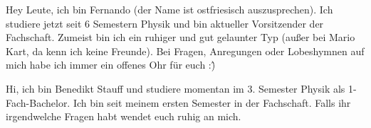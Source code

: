 \begin{multicols*}{2}
{Hey Leute, ich bin Fernando (der Name ist ostfriesisch auszusprechen). Ich studiere jetzt seit 6 Semestern Physik und bin aktueller Vorsitzender der Fachschaft. Zumeist bin ich ein ruhiger und gut gelaunter Typ (außer bei Mario Kart, da kenn ich keine Freunde). Bei Fragen, Anregungen oder Lobeshymnen auf mich habe ich immer ein offenes Ohr für euch :\^)}

	
{Hi, ich bin Benedikt Stauff und studiere momentan im 3. Semester Physik als 1-Fach-Bachelor. 
Ich bin seit meinem ersten Semester in der Fachschaft. Falls ihr irgendwelche Fragen habt wendet euch ruhig an mich.}


\end{multicols*}
